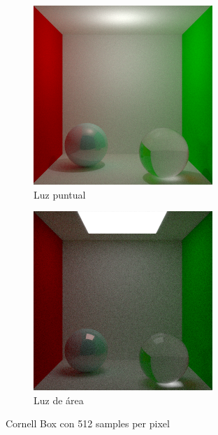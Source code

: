 \documentclass{article}
\begin{document}
\begin{figure}[H]
\begin{subfigure}[h]{0.4\linewidth}
\includegraphics[width=\linewidth]{imgs/cosine_box512.png}
\caption{Luz puntual}
\end{subfigure}
\hfill
\begin{subfigure}[h]{0.4\linewidth}
\includegraphics[width=\linewidth]{imgs/area_box512.png}
\caption{Luz de área}
\end{subfigure}%
\caption{Cornell Box con 512 samples per pixel}
\end{figure}
\end{document}
